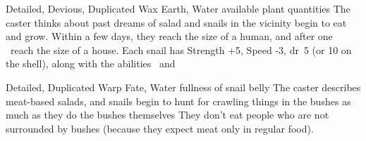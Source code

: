   {Detailed, Devious, Duplicated}%
  {Wax}%
  {Earth, Water}%
  {available plant quantities}%
  {The caster thinks about past dreams of salad and  snails in the vicinity begin to eat and grow.
  Within a few days, they reach the size of a human, and after one \showOnset\ reach the size of a house.
  Each snail has Strength +5, Speed -3, \gls{dr}~5 (or 10 on the shell), along with the abilities \viscid\ and \acidSpray}%
  {}

  {Detailed, Duplicated}%
  {Warp}%
  {Fate, Water}%
  {fullness of snail belly}%
  {The caster describes meat-based salads, and  snails begin to hunt for crawling things in the bushes as much as they do the bushes themselves}%
  {They don't eat people who are not surrounded by bushes (because they expect meat only in regular food).}



